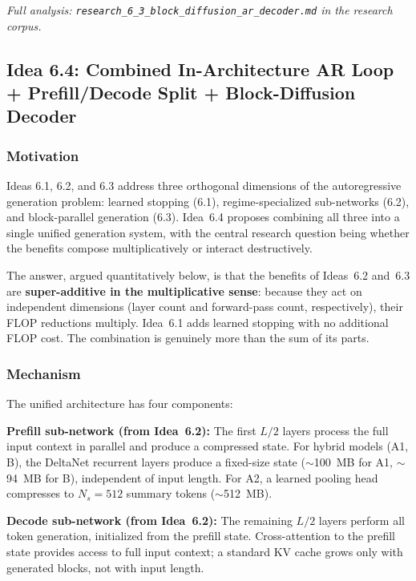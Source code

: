 \documentclass[11pt]{article}
\begin{document}
\par\noindent\textit{Full analysis: \texttt{research\_6\_3\_block\_diffusion\_ar\_decoder.md} in the research corpus.}

\subsection{Idea 6.4: Combined In-Architecture AR Loop + Prefill/Decode Split + Block-Diffusion Decoder}
\label{sec:idea_6_4}

\subsubsection*{Motivation}

Ideas 6.1, 6.2, and 6.3 address three orthogonal dimensions of the autoregressive generation problem: learned stopping (6.1), regime-specialized sub-networks (6.2), and block-parallel generation (6.3). Idea~6.4 proposes combining all three into a single unified generation system, with the central research question being whether the benefits compose multiplicatively or interact destructively.

The answer, argued quantitatively below, is that the benefits of Ideas~6.2 and~6.3 are \textbf{super-additive in the multiplicative sense}: because they act on independent dimensions (layer count and forward-pass count, respectively), their FLOP reductions multiply. Idea~6.1 adds learned stopping with no additional FLOP cost. The combination is genuinely more than the sum of its parts.

\subsubsection*{Mechanism}

The unified architecture has four components:

\textbf{Prefill sub-network (from Idea~6.2):} The first $L/2$ layers process the full input context in parallel and produce a compressed state. For hybrid models (A1, B), the DeltaNet recurrent layers produce a fixed-size state ($\sim$100~MB for A1, $\sim$94~MB for B), independent of input length. For A2, a learned pooling head compresses to $N_s = 512$ summary tokens ($\sim$512~MB).

\textbf{Decode sub-network (from Idea~6.2):} The remaining $L/2$ layers perform all token generation, initialized from the prefill state. Cross-attention to the prefill state provides access to full input context; a standard KV cache grows only with generated blocks, not with input length.
\end{document}
